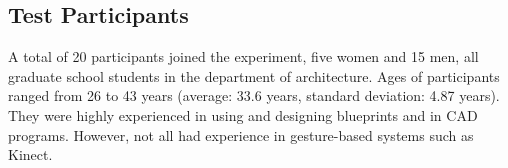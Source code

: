 \subsection{Test Participants}


A total of 20 participants joined the experiment, five women and 15 men, all graduate school students in the department of architecture. Ages of participants ranged from 26 to 43 years (average: 33.6 years, standard deviation: 4.87 years). They were highly experienced in using and designing blueprints and in CAD programs. However, not all had experience in gesture-based systems such as Kinect.

